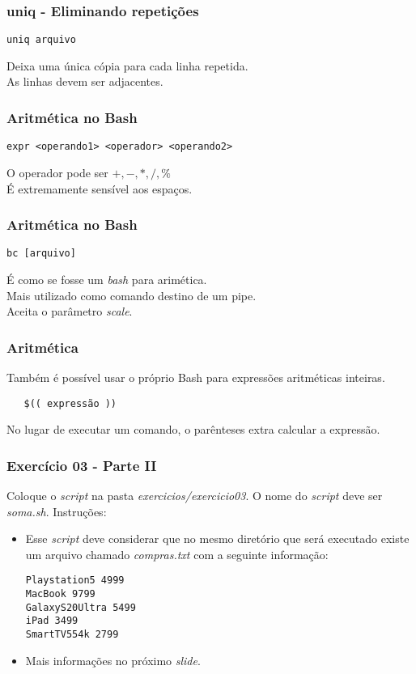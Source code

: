 \documentclass{beamer}
\begin{document}
\begin{frame}[fragile]
   \frametitle{uniq - Eliminando repetições}
   \begin{verbatim}
uniq arquivo 
   \end{verbatim}
   Deixa uma única cópia para cada linha repetida. \\
   As linhas devem ser adjacentes. \\
\end{frame}

\begin{frame}[fragile]
   \frametitle{Aritmética no Bash}
   \begin{verbatim}
expr <operando1> <operador> <operando2>
   \end{verbatim}
   O operador pode ser $+,-,*,/,\%$ \\
   É extremamente sensível aos espaços. \\
\end{frame}

\begin{frame}[fragile]
   \frametitle{Aritmética no Bash}
   \begin{verbatim}
bc [arquivo]
   \end{verbatim}
   É como se fosse um \textit{bash} para arimética. \\
   Mais utilizado como comando destino de um pipe. \\
   Aceita o parâmetro \textit{scale}.\\
\end{frame}

\begin{frame}[fragile]
   \frametitle{Aritmética}
   Também é possível usar o próprio Bash para expressões aritméticas inteiras.
   \begin{verbatim}
   $(( expressão ))
   \end{verbatim}
   No lugar de executar um comando, o parênteses extra calcular a expressão. \\
\end{frame}


\begin{frame}[fragile]
   \frametitle{Exercício 03 - Parte II}
   Coloque o \textit{script} na pasta \textit{exercicios/exercicio03}. O nome do \textit{script} deve ser \textit{soma.sh}. Instruções:
   \begin{itemize}
      \item Esse \textit{script} deve considerar que no mesmo diretório que será executado existe um arquivo chamado \textit{compras.txt} com a seguinte informação:
      \begin{verbatim}
Playstation5 4999
MacBook 9799
GalaxyS20Ultra 5499
iPad 3499
SmartTV554k 2799
      \end{verbatim}
      \item Mais informações no próximo \textit{slide}.
   \end{itemize}
\end{frame}
\end{document}
